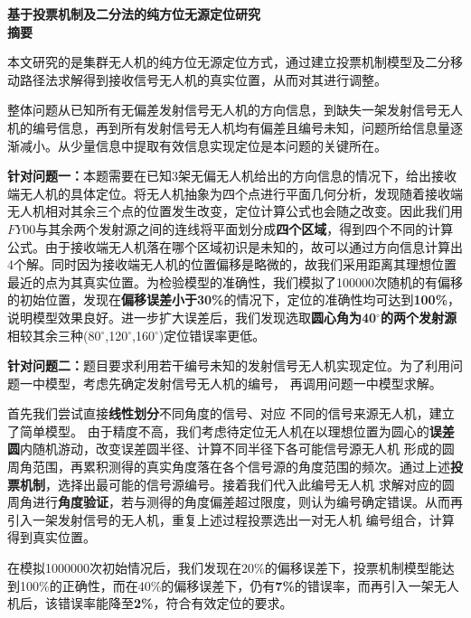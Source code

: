 \documentclass{ctexart}
\begin{document}
\begin{spacing}{2.0}
  \begin{center}
      {\LARGE\textbf{基于投票机制及二分法的纯方位无源定位研究}}\\
      {\Large\textbf{摘要}}\\
  \end{center}
\end{spacing}

本文研究的是集群无人机的纯方位无源定位方式，通过建立投票机制模型及二分移动路径法求解得到接收信号无人机的真实位置，从而对其进行调整。

整体问题从已知所有无偏差发射信号无人机的方向信息，到缺失一架发射信号无人机的编号信息，再到所有发射信号无人机均有偏差且编号未知，问题所给信息量逐渐减小。从少量信息中提取有效信息实现定位是本问题的关键所在。

\textbf{针对问题一：}\quad 本题需要在已知3架无偏无人机给出的方向信息的情况下，给出接收端无人机的具体定位。将无人机抽象为四个点进行平面几何分析，发现随着接收端无人机相对其余三个点的位置发生改变，定位计算公式也会随之改变。因此我们用$FY00$与其余两个发射源之间的连线将平面划分成\textbf{四个区域}，得到四个不同的计算公式。由于接收端无人机落在哪个区域初识是未知的，故可以通过方向信息计算出4个解。同时因为接收端无人机的位置偏移是略微的，故我们采用距离其理想位置最近的点为其真实位置。为检验模型的准确性，我们模拟了100000次随机的有偏移的初始位置，发现在\textbf{偏移误差小于30\%}的情况下，定位的准确性均可达到\textbf{100\%}，说明模型效果良好。进一步扩大误差后，我们发现选取\textbf{圆心角为40$^{\circ}$的两个发射源}相较其余三种(80$^{\circ}$,120$^{\circ}$,160$^{\circ}$)定位错误率更低。

\textbf{针对问题二：}\quad 题目要求利用若干编号未知的发射信号无人机实现定位。为了利用问题一中模型，考虑先确定发射信号无人机的编号，
再调用问题一中模型求解。

首先我们尝试直接\textbf{线性划分}不同角度的信号、对应
不同的信号来源无人机，建立了简单模型。
由于精度不高，我们考虑待定位无人机在以理想位置为圆心的\textbf{误差圆}内随机游动，改变误差圆半径、计算不同半径下各可能信号源无人机
形成的圆周角范围，再累积测得的真实角度落在各个信号源的角度范围的频次。通过上述\textbf{投票机制}，选择出最可能的信号源编号。接着我们代入此编号无人机
求解对应的圆周角进行\textbf{角度验证}，若与测得的角度偏差超过限度，则认为编号确定错误。从而再引入一架发射信号的无人机，重复上述过程投票选出一对无人机
编号组合，计算得到真实位置。

在模拟1000000次初始情况后，我们发现在\textbf{$20\%$}的偏移误差下，投票机制模型能达到100\%的正确性，而在\textbf{$40\%$}的偏移误差下，仍有\textbf{7\%}的错误率，而再引入一架无人机后，该错误率能降至\textbf{2\%}，符合有效定位的要求。
\end{document}
